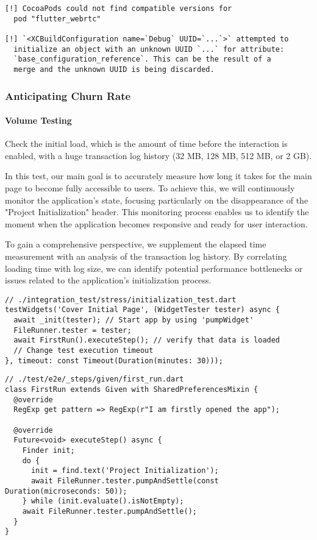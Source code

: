 \begin{lstlisting}[language=terminal]
[!] CocoaPods could not find compatible versions for 
  pod "flutter_webrtc"

[!] `<XCBuildConfiguration name=`Debug` UUID=`...`>` attempted to 
  initialize an object with an unknown UUID `...` for attribute: 
  `base_configuration_reference`. This can be the result of a 
  merge and the unknown UUID is being discarded.
\end{lstlisting}


\subsubsection{Anticipating Churn Rate}

\paragraph{Volume Testing} Check the initial load, which is the amount of time before the interaction is enabled, with a 
huge transaction log history (32 MB, 128 MB, 512 MB, or 2 GB).

In this test, our main goal is to accurately measure how long it takes for the main page to become fully accessible to 
users. To achieve this, we will continuously monitor the application's state, focusing particularly on the disappearance 
of the "Project Initialization" header. This monitoring process enables us to identify the moment when the application 
becomes responsive and ready for user interaction. 

To gain a comprehensive perspective, we supplement the elapsed time measurement with an analysis of the transaction log 
history. By correlating loading time with log size, we can identify potential performance bottlenecks or issues related 
to the application's initialization process.

\begin{lstlisting}
// ./integration_test/stress/initialization_test.dart
testWidgets('Cover Initial Page', (WidgetTester tester) async {
  await _init(tester); // Start app by using 'pumpWidget'
  FileRunner.tester = tester;
  await FirstRun().executeStep(); // verify that data is loaded
  // Change test execution timeout
}, timeout: const Timeout(Duration(minutes: 30)));
\end{lstlisting}
\begin{lstlisting}
// ./test/e2e/_steps/given/first_run.dart
class FirstRun extends Given with SharedPreferencesMixin {
  @override
  RegExp get pattern => RegExp(r"I am firstly opened the app");

  @override
  Future<void> executeStep() async {
    Finder init;
    do {
      init = find.text('Project Initialization');
      await FileRunner.tester.pumpAndSettle(const Duration(microseconds: 50));
    } while (init.evaluate().isNotEmpty);
    await FileRunner.tester.pumpAndSettle();
  }
}
\end{lstlisting}

